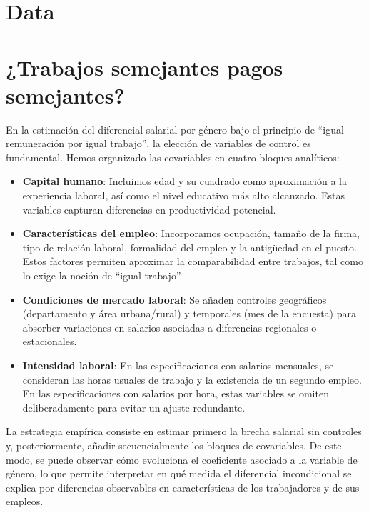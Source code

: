 \documentclass[12pt,a4paper,onecolumn]{article}
\begin{document}
\section{Data}

\section{¿Trabajos semejantes pagos semejantes?}

En la estimación del diferencial salarial por género bajo el principio de 
``igual remuneración por igual trabajo'', la elección de variables de control 
es fundamental. Hemos organizado las covariables en cuatro bloques analíticos:

\begin{itemize}
    \item \textbf{Capital humano}: Incluimos edad y su cuadrado como 
    aproximación a la experiencia laboral, así como el nivel educativo más alto 
    alcanzado. Estas variables capturan diferencias en productividad potencial.

    \item \textbf{Características del empleo}: Incorporamos ocupación, tamaño 
    de la firma, tipo de relación laboral, formalidad del empleo y la antigüedad 
    en el puesto. Estos factores permiten aproximar la comparabilidad entre 
    trabajos, tal como lo exige la noción de ``igual trabajo''.

    \item \textbf{Condiciones de mercado laboral}: Se añaden controles 
    geográficos (departamento y área urbana/rural) y temporales (mes de la 
    encuesta) para absorber variaciones en salarios asociadas a diferencias 
    regionales o estacionales.

    \item \textbf{Intensidad laboral}: En las especificaciones con salarios 
    mensuales, se consideran las horas usuales de trabajo y la existencia de un 
    segundo empleo. En las especificaciones con salarios por hora, estas 
    variables se omiten deliberadamente para evitar un ajuste redundante.
\end{itemize}

La estrategia empírica consiste en estimar primero la brecha salarial sin 
controles y, posteriormente, añadir secuencialmente los bloques de covariables. 
De este modo, se puede observar cómo evoluciona el coeficiente asociado a la 
variable de género, lo que permite interpretar en qué medida el diferencial 
incondicional se explica por diferencias observables en características de los 
trabajadores y de sus empleos.
\end{document}
